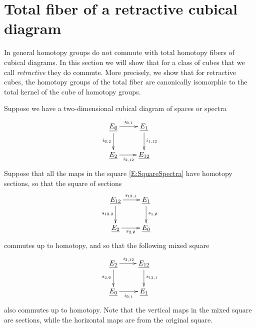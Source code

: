 \documentclass[12pt]{amsart}
\newcommand{\R}{{\mathbb R}}
\newcommand{\Z}{{\mathbb Z}}
\newcommand{\tfiber}{\operatorname{tfiber}}
\newcommand{\tkernel}{\operatorname{tkernel}}
\newcommand{\rConf}{\operatorname{rConf}}
\newcommand{\HZ}{\underline{H}\Z}
\theoremstyle{plain}
\newtheorem{prop}[thm]{Proposition}
\theoremstyle{definition}
\theoremstyle{remark}
\begin{document}
\section{Total fiber of a retractive cubical diagram}\label{S:Retractive}
In general homotopy groups do not commute with total homotopy fibers of cubical diagrams. In this section we will show that for a class of cubes that we call {\it retractive} they do commute. More precisely, we show that for retractive cubes, the homotopy groups of the total fiber are canonically isomorphic to the total kernel of the cube of homotopy groups.



Suppose we have a two-dimensional cubical diagram of spaces or spectra
\begin{equation}\label{E:SquareSpectra}
\xymatrix{
\underline{E_{\emptyset}} \ar[r]^{i_{\emptyset, 1}}\ar[d]_{i_{\emptyset, 2}} & \underline{E_1}\ar[d]^{i_{1, 12}} \\
\underline{E_2} \ar[r]_{i_{2, 12}} & \underline{E_{12}}
}
\end{equation}
Suppose that all the maps in the square \eqref{E:SquareSpectra} have homotopy sections, so that the square of sections
$$
\xymatrix{
\underline{E_{12}} \ar[r]^{s_{12, 1}}\ar[d]_{s_{12,2}} & \underline{E_1}\ar[d]^{s_{1, \emptyset}} \\
\underline{E_2} \ar[r]_{s_{2, \emptyset}} & \underline{E_{0}}
}
$$
commutes up to homotopy, and so that the following mixed square
$$
\xymatrix{
\underline{E_{2}} \ar[r]^{i_{2, 12}}\ar[d]_{s_{2, \emptyset}} & \underline{E_{12}}\ar[d]^{s_{12, 1}} \\
\underline{E_0} \ar[r]_{i_{\emptyset, 1}} & \underline{E_{1}}
}
$$
also commutes up to homotopy. Note that the vertical maps in the mixed square are sections, while the horizontal maps are from the original square.
\end{document}
